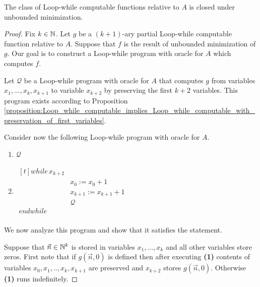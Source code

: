 \documentclass[10pt]{amsart}
\begin{document}
\begin{proposition}\label{proposition:Loop_while_computable_functions_closed_under_unbounded_minimization}
	The class of Loop-while computable functions relative to $A$ is closed under unbounded minimization.
\end{proposition}
\begin{proof}
	Fix $k\in {\mathbb N}$. Let $g$ be a $(k + 1)$-ary partial Loop-while computable function relative to $A$. Suppose that $f$ is the result of unbounded minimization of $g$. Our goal is to construct a Loop-while program with oracle for $A$ which computes $f$.

	Let $\mathcal{Q}$ be a Loop-while program with oracle for $A$ that computes $g$ from variables $x_1,...,x_k,x_{k+1}$ to variable $x_{k + 2}$ by preserving the first $k + 2$ variables. This program exists according to Proposition \ref{proposition:Loop_while_computable_implies_Loop_while_computable_with_preservation_of_first_variables}.

	Consider now the following Loop-while program with oracle for $A$.
	\begin{enumerate}[label=\textbf{(\arabic*)}, leftmargin=3.0em]
		\item $\mathcal{Q}$
		\item
		      $\begin{aligned}[t]
				      \mathit{while}\,x_{k+2} \\
				       & x_0:= x_0 + 1        \\
				       & x_{k+1}:=x_{k+1} + 1 \\
				       & \mathcal{Q}          \\
				      \mathit{endwhile}       \\
			      \end{aligned}$

	\end{enumerate}
	We now analyze this program and show that it satisfies the statement.

	Suppose that $\vec{n} \in {\mathbb N}^k$ is stored in variables $x_1,...,x_k$ and all other variables store zeros. First note that if $g(\vec{n},0)$ is defined then after executing \textbf{(1)} contents of variables $x_0,x_1,..,x_k,x_{k+1}$ are preserved and $x_{k+2}$ stores $g(\vec{n},0)$. Otherwise \textbf{(1)} runs indefinitely.


\end{proof}
\end{document}
